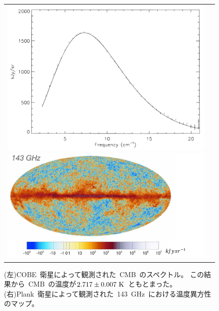 \begin{figure}[h]
  \begin{tabular}{cc}
    \begin{minipage}[t]{0.5\hsize}
      \centering
      \includegraphics[keepaspectratio, scale=0.3]{2_cosmology/figs/cobe.png}
    \end{minipage} 
    \begin{minipage}[t]{0.5\hsize}
      \centering
      \includegraphics[keepaspectratio, scale=0.9]{2_cosmology/figs/plank_temp143.pdf}
    \end{minipage}
  \end{tabular}
  \caption{(左)COBE~衛星によって観測された~CMB~のスペクトル\cite{cobe}。
  この結果から~CMB~の温度が$2.717 \pm 0.007~{\rm K}$~ともとまった。
  (右)Plank~衛星によって観測された~143~GHz~における温度異方性のマップ\cite{plank}。}
  \label{cobe_plank}
\end{figure}

